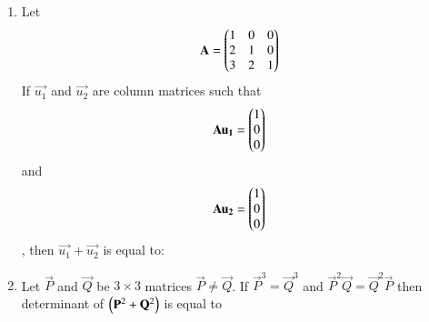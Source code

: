\documentclass[journal,onecolumn]{IEEEtran}
\theoremstyle{remark}
\begin{document}
\begin{enumerate}
	\item Let \begin{align*}
	\mathbf{A} = \begin{pmatrix} 
		1&0&0\\
		2&1&0\\
		3&2&1
	\end{pmatrix}
	\end{align*} If $\vec{u_1}$ and $\vec{u_2}$ are column matrices such that
	\begin{align*}
		\mathbf{Au_1} = \begin{pmatrix}1\\0\\0\end{pmatrix}
	\end{align*} and 
	\begin{align*}
		\mathbf{Au_2} = \begin{pmatrix}1\\0\\0\end{pmatrix}
	\end{align*}, then $\vec{u_1} + \vec{u_2}$ is equal to:
	\hfill{}
        \begin{enumerate}
        \end{enumerate}

	\item Let $\vec{P}$ and $\vec{Q}$ be $3\times3$ matrices $\vec{P}\neq \vec{Q}$. If $\vec{P}^3=\vec{Q}^3$ and $\vec{P}^2\vec{Q}=\vec{Q}^2\vec{P}$ then determinant of $\left(\mathbf{P}^2+\mathbf{Q}^2\right)$ is equal to
	\hfill{}
        \begin{enumerate}
        \end{enumerate}


\end{enumerate}
\end{document}

